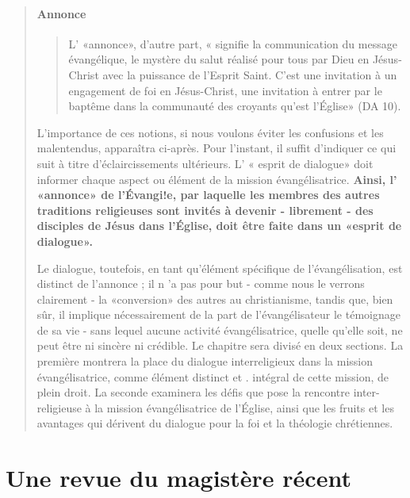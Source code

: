 \begin{quote}
\paragraph{Annonce}
\begin{quote}
    L' «annonce», d'autre part, « signifie la communication du
message évangélique, le mystère du salut réalisé pour tous par
Dieu en Jésus-Christ avec la puissance de l'Esprit Saint. C'est
une invitation à un engagement de foi en Jésus-Christ, une
invitation à entrer par le baptême dans la communauté des
croyants qu'est l'Église» (DA 10).
\end{quote}

L'importance de ces notions, si nous voulons éviter les
confusions et les malentendus, apparaîtra ci-après. Pour l'instant,
il suffit d'indiquer ce qui suit à titre d'éclaircissements
ultérieurs. L' « esprit de dialogue» doit informer chaque aspect
ou élément de la mission évangélisatrice. \textbf{Ainsi, l' «annonce»
de l'Évangi!e, par laquelle les membres des autres traditions
religieuses sont invités à devenir - librement - des disciples de
Jésus dans l'Église, doit être faite dans un «esprit de dialogue».} 


Le dialogue, toutefois, en tant qu'élément spécifique
de l'évangélisation, est distinct de l'annonce ; il n 'a pas pour
but - comme nous le verrons clairement - la «conversion»
des autres au christianisme, tandis que, bien sûr, il implique
nécessairement de la part de l'évangélisateur le témoignage de
sa vie - sans lequel aucune activité évangélisatrice, quelle
qu'elle soit, ne peut être ni sincère ni crédible.
Le chapitre sera divisé en deux sections. La première montrera
la place du dialogue interreligieux dans la mission évangélisatrice,
comme élément distinct et . intégral de cette
mission, de plein droit. La seconde examinera les défis que
pose la rencontre inter-religieuse à la mission évangélisatrice
de l'Église, ainsi que les fruits et les avantages qui dérivent du
dialogue pour la foi et la théologie chrétiennes.

\end{quote}

\section{Une revue du magistère récent}


